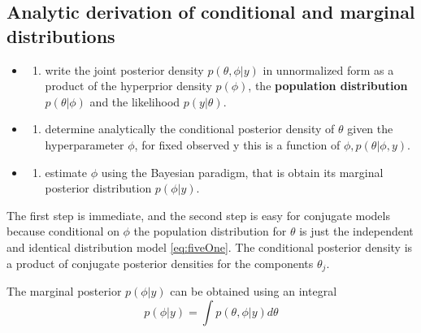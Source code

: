 \documentclass[
]{book}
\providecommand{\tightlist}{%
  \setlength{\itemsep}{0pt}\setlength{\parskip}{0pt}}
\theoremstyle{definition}
\theoremstyle{definition}
\theoremstyle{definition}
\theoremstyle{definition}
\theoremstyle{remark}
\begin{document}
\hypertarget{analytic-derivation-of-conditional-and-marginal-distributions}{%
\subsection*{Analytic derivation of conditional and marginal distributions}\label{analytic-derivation-of-conditional-and-marginal-distributions}}

\begin{itemize}
\item
  \begin{enumerate}
  \def\labelenumi{(\arabic{enumi})}
  \tightlist
  \item
    write the joint posterior density \(p(\theta, \phi| y)\) in unnormalized form as a product of the hyperprior density \(p(\phi)\), the \textbf{population distribution} \(p(\theta| \phi)\) and the likelihood \(p(y|\theta)\).
  \end{enumerate}
\item
  \begin{enumerate}
  \def\labelenumi{(\arabic{enumi})}
  \setcounter{enumi}{1}
  \tightlist
  \item
    determine analytically the conditional posterior density of \(\theta\) given the hyperparameter \(\phi\), for fixed observed y this is a function of \(\phi, p(\theta | \phi,y)\).
  \end{enumerate}
\item
  \begin{enumerate}
  \def\labelenumi{(\arabic{enumi})}
  \setcounter{enumi}{2}
  \tightlist
  \item
    estimate \(\phi\) using the Bayesian paradigm, that is obtain its marginal posterior distribution \(p(\phi| y)\).
  \end{enumerate}
\end{itemize}

The first step is immediate, and the second step is easy for conjugate models because conditional on \(\phi\) the population distribution for \(\theta\) is just the independent and identical distribution model \eqref{eq:fiveOne}. The conditional posterior density is a product of conjugate posterior densities for the components \(\theta_j\).

The marginal posterior \(p(\phi| y )\) can be obtained using an integral
\begin{equation}
p(\phi|y) = \int p(\theta,\phi|y)d\theta
\label{eq:fiveFour}
\end{equation}
\end{document}
